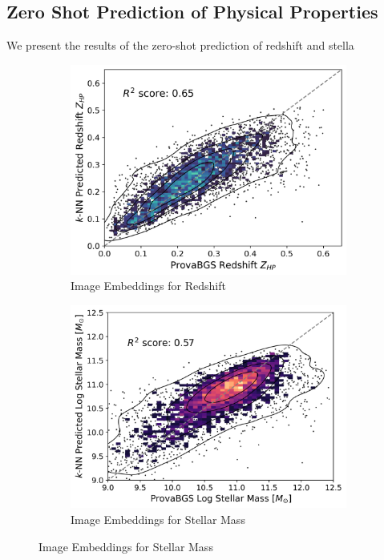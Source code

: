 \documentclass[a4paper,12pt]{article}
\begin{document}
\subsection{Zero Shot Prediction of Physical Properties}
We present the results of the zero-shot prediction of redshift and stella


\begin{figure}[H]
    \centering
    \begin{subfigure}[b]{0.48\textwidth}
        \centering
        \includegraphics[width=\textwidth]{../figures/zeroshot_redshift_image.png}
        \caption{Image Embeddings for Redshift}
        \label{fig:redshift_image}
    \end{subfigure}%
    \hfill
    \begin{subfigure}[b]{0.48\textwidth}
        \centering
        \includegraphics[width=\textwidth]{../figures/zeroshot_stellarmass_image.png}
        \caption{Image Embeddings for Stellar Mass}
        \label{fig:stellarmass_image}
    \end{subfigure}
    

\end{figure}
\end{document}
